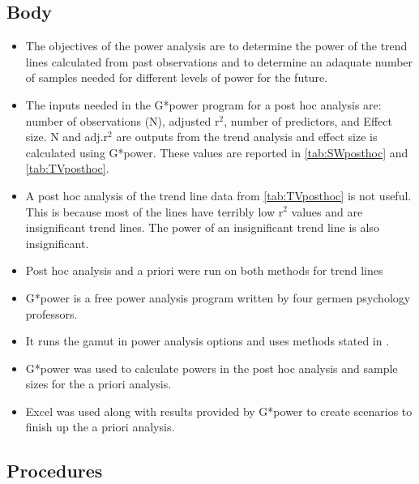 \subsection{Body}
\begin{itemize}
	\item The objectives of the power analysis are to determine the power of the trend lines calculated from past observations and to determine an adaquate number of samples needed for different levels of power for the future.
	\item The inputs needed in the G*power program for a post hoc analysis are: number of observations (N), adjusted r$^2$, number of predictors, and Effect size.  N and adj.r$^2$ are  outputs from the trend analysis and effect size is calculated using G*power.  These values are reported in \autoref{tab:SWposthoc} and \autoref{tab:TVposthoc}.
	\item A post hoc analysis of the trend line data from \autoref{tab:TVposthoc} is not useful.  This is because most of the lines have terribly low r$^2$ values and are insignificant trend lines.  The power of an insignificant trend line is also insignificant.
	\item Post hoc analysis and a priori were  run on both methods for trend lines
	\item G*power is a free power analysis program written by four germen psychology professors.
	\item It runs the gamut in power analysis options and uses methods stated in \citep{cohen1992power}.
	\item G*power was used to calculate powers in the post hoc analysis and sample sizes for the a priori analysis.
	\item Excel was used along with results provided by G*power to create scenarios to finish up the a priori analysis.
\end{itemize}
\subsection{Procedures}
